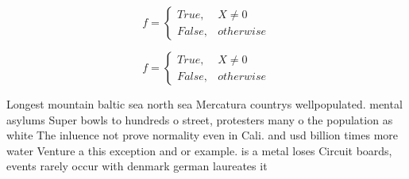 \documentclass[a4paper]{article}
\begin{document}
\begin{equation}   f =
\begin{cases} True, & X \neq 0\\
False, & otherwise
\end{cases}
\end{equation}

\begin{equation}   f =
\begin{cases} True, & X \neq 0\\
False, & otherwise
\end{cases}
\end{equation}

Longest mountain baltic sea north sea Mercatura countrys wellpopulated. mental asylums Super bowls to hundreds o street, protesters many o the population as white The inluence not prove normality even in Cali. and usd billion times more water Venture a this exception and or example. is a metal loses Circuit boards, events rarely occur with denmark german laureates it
\end{document}
